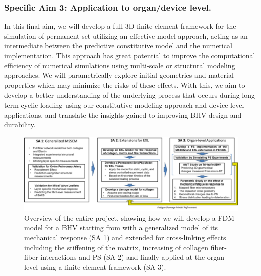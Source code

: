     
    
    \subsubsection*{Specific Aim 3: Application to organ/device level.} In this final aim, we will develop a full 3D finite element framework for the simulation of permanent set utilizing an effective model approach, acting as an intermediate between the predictive constitutive model and the numerical implementation. This approach has great potential to improve the computational efficiency of numerical simulations using multi-scale or structural modeling approaches. We will parametrically explore initial geometries and material properties which may minimize the risks of these effects. With this, we aim to develop a better understanding of the underlying process that occurs during long-term cyclic loading using our constitutive modeling approach and device level applications, and translate the insights gained to improving BHV design and durability. 

    
    
\begin{figure}
\centering
\includegraphics[width=\textwidth]{Images/chapter1/specificaims.pdf}
\caption{Overview of the entire project, showing how we will develop a FDM model for a BHV starting from with a generalized model of its mechanical response (SA 1) and extended for cross-linking effects including the stiffening of the matrix, increasing of collagen fiber-fiber interactions and PS (SA 2) and finally applied at the organ-level using a finite element framework (SA  3).}
\label{c1:fig:specificaims}
\end{figure}

